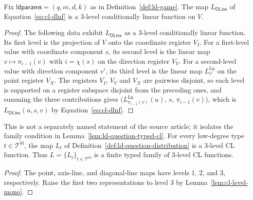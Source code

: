 \begin{lemma}\label{lem:ld-dline-level}
	\leanok
	Fix $\mathsf{ldparams} = (q,m,d,k)$ as in Definition~\ref{def:ld-game}. The map $L_{\mathsf{DLine}}$ of Equation~\eqref{eq:cl-dlnf} is a $3$-level conditionally linear function on $V$.
\end{lemma}
\begin{proof}
	\leanok
	The following data exhibit $L_{\mathsf{DLine}}$ as a $3$-level conditionally linear function. Its first level is the projection of $V$ onto the coordinate register $V_I$. For a first-level value with coordinate component $s$, its second level is the linear map $v \mapsto \pi_{i-1}(v)$ with $i = \chi(s)$ on the direction register $V_V$. For a second-level value with direction component $v'$, its third level is the linear map $L^{\mathrm{Ln}}_{v'}$ on the point register $V_X$. The registers $V_I$, $V_V$ and $V_X$ are pairwise disjoint, so each level is supported on a register subspace disjoint from the preceding ones, and summing the three contributions gives $\bigl(L^{\mathrm{Ln}}_{\pi_{i-1}(v)}(u),\, s,\, \pi_{i-1}(v)\bigr)$, which is $L_{\mathsf{DLine}}(u,s,v)$ by Equation~\eqref{eq:cl-dlnf}.
\end{proof}

\begin{lemma}\label{lem:ld-question-cl-family}
	\leanok
	This is not a separately named statement of the source article; it isolates the family condition in Lemma~\ref{lem:ld-question-typed-cl}. For every low-degree type $t \in \mathcal T^{\mathrm{ld}}$, the map $L_t$ of Definition~\ref{def:ld-question-distribution} is a $3$-level CL function. Thus $L = \{L_t\}_{t \in \mathcal T^{\mathrm{ld}}}$ is a finite typed family of $3$-level CL functions.
\end{lemma}
\begin{proof}
	\leanok
	The point, axis-line, and diagonal-line maps have levels $1$, $2$, and $3$, respectively. Raise the first two representations to level $3$ by Lemma~\ref{lem:cl-level-mono}.
\end{proof}

